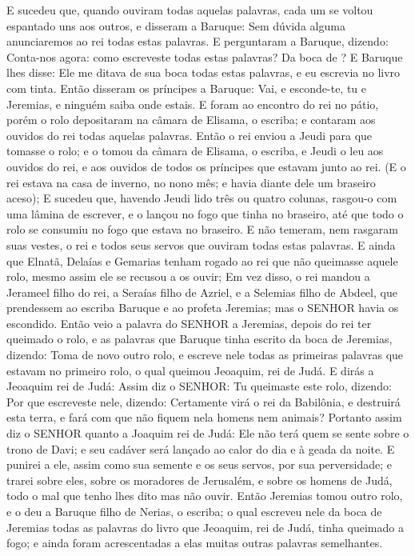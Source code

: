{E sucedeu que, quando ouviram todas aquelas palavras, cada um se voltou espantado uns aos outros, e disseram a Baruque: Sem dúvida alguma anunciaremos ao rei todas estas palavras.
E perguntaram a Baruque, dizendo: Conta-nos agora: como escreveste todas estas palavras? Da boca de
{} ?
E Baruque lhes disse: Ele me ditava de sua boca todas estas palavras, e eu escrevia no livro com tinta.
Então disseram os príncipes a Baruque: Vai, e esconde-te, tu e Jeremias, e ninguém saiba onde estais.
E foram ao encontro do rei no pátio, porém o rolo depositaram na câmara de Elisama, o escriba; e contaram aos ouvidos do rei todas aquelas palavras.
Então o rei enviou a Jeudi para que tomasse o rolo; e o tomou da câmara de Elisama, o escriba, e Jeudi o leu aos ouvidos do rei, e aos ouvidos de todos os príncipes que estavam junto ao rei.
(E o rei estava na casa de inverno, no nono mês; e havia diante dele um braseiro aceso);
E sucedeu que, havendo Jeudi lido três ou quatro colunas, rasgou-o com uma lâmina de escrever, e o lançou no fogo que tinha no braseiro, até que todo o rolo se consumiu no fogo que estava no braseiro.
E não temeram, nem rasgaram suas vestes, o rei e todos seus servos que ouviram todas estas palavras.
E ainda que Elnatã, Delaías e Gemarias tenham rogado ao rei que não queimasse aquele rolo, mesmo assim ele se recusou a os ouvir;
Em vez disso, o rei mandou a Jerameel filho do rei, a Seraías filho de Azriel, e a Selemias filho de Abdeel, que prendessem ao escriba Baruque e ao profeta Jeremias; mas o SENHOR havia os escondido.
Então veio a palavra do SENHOR a Jeremias, depois do rei ter queimado o rolo, e as palavras que Baruque tinha escrito da boca de Jeremias, dizendo:
Toma de novo outro rolo, e escreve nele todas as primeiras palavras que estavam no primeiro rolo, o qual queimou Jeoaquim, rei de Judá.
E dirás a Jeoaquim rei de Judá: Assim diz o SENHOR: Tu queimaste este rolo, dizendo: Por que escreveste nele, dizendo: Certamente virá o rei da Babilônia, e destruirá esta terra, e fará com que não fiquem nela homens nem animais?
Portanto assim diz o SENHOR quanto a Joaquim rei de Judá: Ele não terá quem se sente sobre o trono de Davi; e seu cadáver será lançado ao calor do dia e à geada da noite.
E punirei a ele, assim como sua semente e os seus servos, por sua perversidade; e trarei sobre eles, sobre os moradores de Jerusalém, e sobre os homens de Judá, todo o mal que tenho lhes dito mas não
{} ouvir.
Então Jeremias tomou outro rolo, e o deu a Baruque filho de Nerias, o escriba; o qual escreveu nele da boca de Jeremias todas as palavras do livro que Jeoaquim, rei de Judá, tinha queimado a fogo; e ainda foram acrescentadas a elas muitas outras palavras semelhantes.

\par }

